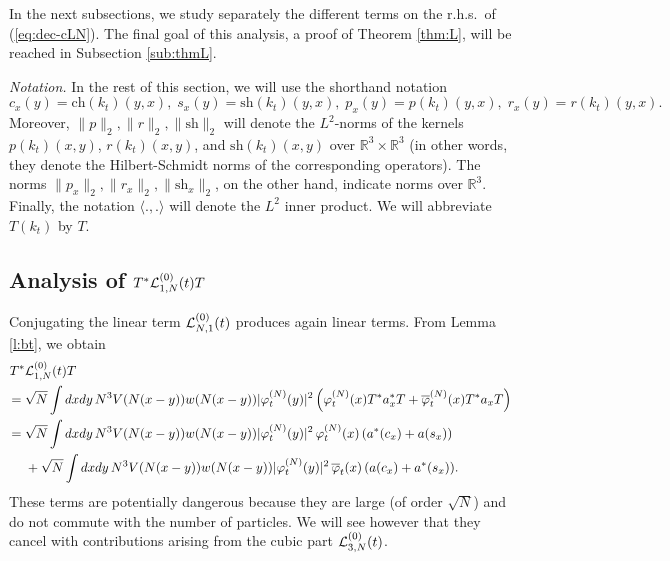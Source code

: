\documentclass[11pt,a4paper]{article}
\newcommand{\bR}{{\mathbb R}}
\newcommand{\cL}{{\cal L}}
\begin{document}
In the next subsections, we study separately the different terms on the r.h.s.\ of (\ref{eq:dec-cLN}). The final goal of this analysis, a proof of Theorem \ref{thm:L}, will be reached in Subsection \ref{sub:thmL}.

\medskip

{\it Notation.} In the rest of this section, we will use the shorthand notation \begin{equation}\label{eq:def-csprx} 
c_x (y) = \text{ch} (k_t) (y,x), \;  s_x (y) = \text{sh} (k_t) (y,x), \; p_x (y) = p (k_t) (y,x), \; 
r_x (y) = r (k_t) (y,x). \end{equation}
Moreover, $\| p \|_2 , \| r \|_2, \|\text{sh} \|_2$ will denote the $L^2$-norms of the kernels $p (k_t) (x,y)$, $r (k_t) (x,y)$, and $\text{sh} (k_t) (x,y)$ over $\bR^3 \times \bR^3$ (in other words, they denote the Hilbert-Schmidt norms of the corresponding operators). The norms $\| p_x \|_2, \| r_x \|_2, \| \text{sh}_x \|_2$, on the other hand, indicate norms over $\bR^3$. Finally, the notation $\langle . , . \rangle$ will denote the $L^2$ inner product. We will abbreviate $T(k_t)$ by $T$.


\subsection{Analysis of $T^* \cL^{(0)}_{1,N} (t) T$}

Conjugating the linear term $\cL^{(0)}_{N,1} (t)$ produces again linear terms. {F}rom Lemma \ref{l:bt}, we obtain
\begin{equation}\label{eq:TL1T} \begin{split} T^* & \cL^{(0)}_{1,N} (t) T \\ = \; & \sqrt{N} \int dx dy \, N^3 V (N (x-y)) w (N (x-y)) |\varphi_t^{(N)} (y)|^2 \left( \varphi^{(N)}_t (x) T^* a^*_x T + \overline{\varphi}_t^{(N)} (x) T^* a_x T \right) \\ 
= \; &\sqrt{N} \int dx dy \, N^3 V (N (x-y)) w (N (x-y)) |\varphi_t^{(N)} (y)|^2 \, \varphi^{(N)}_t (x)  \, ( a^*(c_x) + a(s_x)) \\ &+ \sqrt{N} \int dx dy \, N^3 V (N (x-y)) w (N (x-y)) |\varphi_t^{(N)} (y)|^2 \, \overline{\varphi}_t (x)  \, ( a (c_x) + a^* (s_x)). \end{split} \end{equation}
These terms are potentially dangerous because they are large (of order $\sqrt{N}$) and do not commute with the number of particles. We will see however that they cancel with contributions arising from the cubic part $\cL_{3,N}^{(0)} (t)$. 
\end{document}
